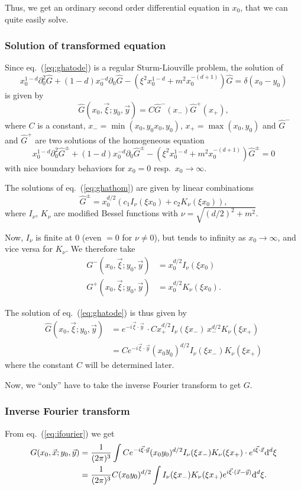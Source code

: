 Thus, we get an ordinary second order differential equation in $x_0$, that we can quite easily solve.

\subsubsection{Solution of transformed equation}
Since eq.~(\ref{eq:ghatode}) is a regular Sturm-Liouville problem, the solution of
$$
x_0^{1-d}\partial_0^2 \hat{G} + (1-d)x_0^{-d}\partial_0\hat{G}-(\xi^2 x_0^{1-d} + m^2 x_0^{-(d+1)})\hat{G}=\delta(x_0-y_0)
$$
is given by
$$\hat{G}(x_0,\vec\xi;y_0,\vec y)=C \hat{G}^{-}(x_{-}) \hat{G}^{+}(x_{+}),$$
where $C$ is a constant, $x_{-}=\min(x_0,y_0x_0,y_0)$, $x_{+}=\max(x_0,y_0)$ and
$\hat{G}^{-}$ and $\hat{G}^{+}$ are two solutions of the homogeneous equation
\begin{equation}\label{eq:ghathom}
x_0^{1-d}\partial_0^2 \hat{G}^\pm + (1-d)x_0^{-d}\partial_0\hat{G}^\pm-(\xi^2 x_0^{1-d} + m^2 x_0^{-(d+1)})\hat{G}^\pm=0
\end{equation}
with nice boundary behaviors for $x_0=0$ resp.\ $x_0\to\infty$.

The solutions of eq.~(\ref{eq:ghathom}) are given by linear combinations
$$\hat{G}^\pm=x_0^{d/2}\left(c_1 I_\nu(\xi x_0)+c_2 K_\nu(\xi x_0)\right),$$
where $I_\nu$, $K_\nu$ are modified Bessel functions with $\nu=\sqrt{(d/2)^2+m^2}$.

Now, $I_\nu$ is finite at $0$ (even $=0$ for $\nu\neq0$), but tends to infinity as $x_0\to\infty$, and vice versa for $K_\nu$. We therefore take
\begin{align*}
G^{-}(x_0,\vec\xi;y_0,\vec y)&=x_0^{d/2} I_\nu(\xi x_0) \\
G^{+}(x_0,\vec\xi;y_0,\vec y)&=x_0^{d/2} K_\nu(\xi x_0).
\end{align*}

The solution of eq.~(\ref{eq:ghatode}) is thus given by
\begin{align*}
\hat{G}(x_0,\vec\xi; y_0,\vec y) &= e^{-i\vec{\xi}\cdot\vec{y}}\,\cdot C x_{+}^{d/2} I_\nu(\xi x_{-})\, x_{-}^{d/2} K_\nu(\xi x_{+})\\
&= C e^{-i\vec{\xi}\cdot\vec{y}} (x_0 y_0)^{d/2} I_\nu(\xi x_{-}) K_\nu(\xi x_{+})
\end{align*}
where the constant $C$ will be determined later.

Now, we ``only'' have to take the inverse Fourier transform to get $G$.

\subsubsection{Inverse Fourier transform}
From eq.~(\ref{eq:ifourier}) we get
\begin{align*}
G(x_0,\vec x; y_0,\vec y) &= \frac{1}{(2\pi)^3} \int C e^{-i\vec{\xi}\cdot\vec{y}} (x_0 y_0)^{d/2} I_\nu(\xi x_{-}) K_\nu(\xi x_{+}) \cdot e^{i\vec{\xi}\cdot\vec{x}} \mathrm{d}^d\xi \\
&= \frac{1}{(2\pi)^3} C (x_0 y_0)^{d/2} \int I_\nu(\xi x_{-}) K_\nu(\xi x_{+}) e^{i\vec{\xi}\cdot(\vec x-\vec y)} \mathrm{d}^d\xi.
\end{align*}

